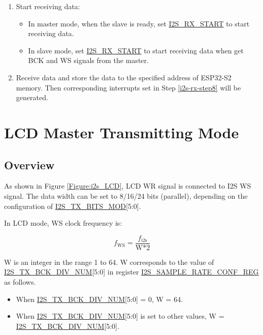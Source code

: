 \documentclass[main\_\_EN.tex]{subfiles}
\begin{document}
\begin{enumerate}
    \item Start receiving data:
    \begin{itemize}
        \item In master mode, when the slave is ready, set \hyperref[fielddesc:I2SRXSTART]{I2S\_RX\_START} to start receiving data.
        \item In slave mode, set \hyperref[fielddesc:I2SRXSTART]{I2S\_RX\_START} to start receiving data when get BCK and WS signals from the master.
    \end{itemize}


    \item Receive data and store the data to the specified address of ESP32-S2 memory. Then corresponding interrupts set in Step \ref{i2s-rx-step8} will be generated.
\end{enumerate}


\section{LCD Master Transmitting Mode}\label{LCDMODE}

\subsection{Overview}\label{subsubsection:overview}

As shown in Figure \ref{Figure:i2s_LCD}, LCD WR signal is connected to I2S WS signal. The data width can be set to 8/16/24 bits (parallel), depending on the configuration of \hyperref[fielddesc:I2STXBITSMOD]{I2S\_TX\_BITS\_MOD}[5:0].

In LCD mode, WS clock frequency is:

$$f_{\textrm{WS}}=\frac{f_{\textrm{i2s}}}{\textrm{W} * \textrm{2}}$$

W is an integer in the range 1 to 64. W corresponds to the value of \hyperref[fielddesc:I2STXBCKDIVNUM]{I2S\_TX\_BCK\_DIV\_NUM}[5:0] in register \hyperref[regdesc:I2SSAMPLERATECONFREG]{I2S\_SAMPLE\_RATE\_CONF\_REG} as follows.

\begin{itemize}
    \item When \hyperref[fielddesc:I2STXBCKDIVNUM]{I2S\_TX\_BCK\_DIV\_NUM}[5:0] = 0, W = 64.

    \item When \hyperref[fielddesc:I2STXBCKDIVNUM]{I2S\_TX\_BCK\_DIV\_NUM}[5:0] is set to other values,  W = \hyperref[fielddesc:I2STXBCKDIVNUM]{I2S\_TX\_BCK\_DIV\_NUM}[5:0].
\end{itemize}
\end{document}
